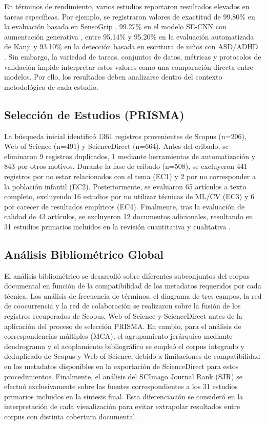 \documentclass{iaesarticle}
\begin{document}
En términos de rendimiento, varios estudios reportaron resultados elevados en tareas específicas. Por ejemplo, se registraron valores de exactitud de 99.80\% en la evaluación basada en SensoGrip \cite{Bublin2023}, 99.27\% en el modelo SE-CNN con aumentación generativa \cite{Alshahrani2026}, entre 95.14\% y 95.20\% en la evaluación automatizada de Kanji \cite{Inoue2025} y 93.10\% en la detección basada en escritura de niños con ASD/ADHD \cite{Shin2022}. Sin embargo, la variedad de tareas, conjuntos de datos, métricas y protocolos de validación impide interpretar estos valores como una comparación directa entre modelos. Por ello, los resultados deben analizarse dentro del contexto metodológico de cada estudio.

\FloatBarrier



\subsection{Selección de Estudios (PRISMA)}
La búsqueda inicial identificó 1361 registros provenientes de Scopus (n=206), Web of Science (n=491) y ScienceDirect (n=664). Antes del cribado, se eliminaron 9 registros duplicados, 1 mediante herramientas de automatización y 843 por otros motivos. Durante la fase de cribado (n=508), se excluyeron 441 registros por no estar relacionados con el tema (EC1) y 2 por no corresponder a la población infantil (EC2). Posteriormente, se evaluaron 65 artículos a texto completo, excluyendo 16 estudios por no utilizar técnicas de ML/CV (EC3) y 6 por carecer de resultados empíricos (EC4). Finalmente, tras la evaluación de calidad de 43 artículos, se excluyeron 12 documentos adicionales, resultando en 31 estudios primarios incluidos en la revisión cuantitativa y cualitativa \cite{page2021prisma}.

\subsection{Análisis Bibliométrico Global}
El análisis bibliométrico se desarrolló sobre diferentes subconjuntos del corpus documental en función de la compatibilidad de los metadatos requeridos por cada técnica. Los análisis de frecuencia de términos, el diagrama de tres campos, la red de coocurrencia y la red de colaboración se realizaron sobre la fusión de los registros recuperados de Scopus, Web of Science y ScienceDirect antes de la aplicación del proceso de selección PRISMA. En cambio, para el análisis de correspondencias múltiples (MCA), el agrupamiento jerárquico mediante dendrograma y el acoplamiento bibliográfico se empleó el corpus integrado y deduplicado de Scopus y Web of Science, debido a limitaciones de compatibilidad en los metadatos disponibles en la exportación de ScienceDirect para estos procedimientos. Finalmente, el análisis del SCImago Journal Rank (SJR) se efectuó exclusivamente sobre las fuentes correspondientes a los 31 estudios primarios incluidos en la síntesis final. Esta diferenciación se consideró en la interpretación de cada visualización para evitar extrapolar resultados entre corpus con distinta cobertura documental.
\end{document}
